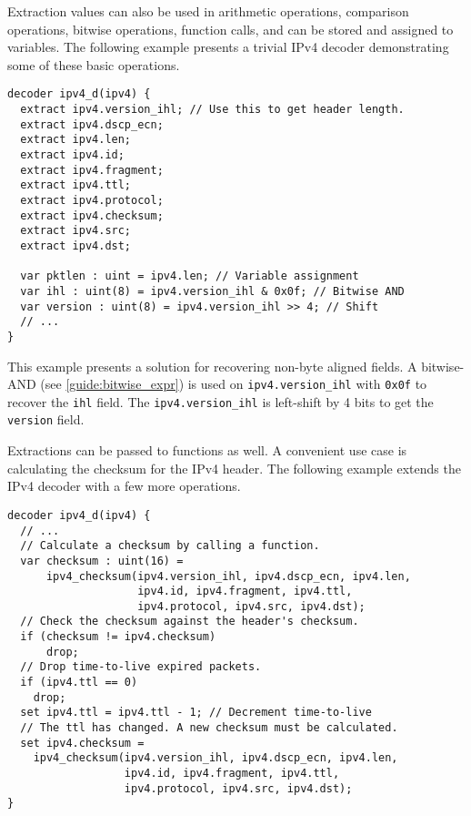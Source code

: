 Extraction values can also be used in arithmetic operations, comparison 
operations, bitwise operations, function calls,
and can be stored and assigned to variables. The following example presents
a trivial IPv4 decoder demonstrating some of these basic operations.

\begin{codepage}
\begin{lstlisting}
decoder ipv4_d(ipv4) {
  extract ipv4.version_ihl; // Use this to get header length.
  extract ipv4.dscp_ecn;
  extract ipv4.len;
  extract ipv4.id;
  extract ipv4.fragment;
  extract ipv4.ttl;
  extract ipv4.protocol;
  extract ipv4.checksum;
  extract ipv4.src;
  extract ipv4.dst;
  
  var pktlen : uint = ipv4.len; // Variable assignment
  var ihl : uint(8) = ipv4.version_ihl & 0x0f; // Bitwise AND
  var version : uint(8) = ipv4.version_ihl >> 4; // Shift
  // ...
}
\end{lstlisting}
\end{codepage}

This example presents a solution for recovering non-byte aligned
fields. A bitwise-AND (see \ref{guide:bitwise_expr}) is used on \texttt{ipv4.version\_ihl}
with \texttt{0x0f} to recover the \texttt{ihl} field. The 
\texttt{ipv4.version\_ihl} is left-shift by 4 bits to get the \texttt{version} field.

Extractions can be passed to functions as well. A convenient use case is 
calculating the checksum for the IPv4 header. 
The following example extends the IPv4 decoder with a few more operations.

\begin{codepage}
\begin{lstlisting}
decoder ipv4_d(ipv4) {
  // ...
  // Calculate a checksum by calling a function.
  var checksum : uint(16) =
      ipv4_checksum(ipv4.version_ihl, ipv4.dscp_ecn, ipv4.len, 
                    ipv4.id, ipv4.fragment, ipv4.ttl, 
                    ipv4.protocol, ipv4.src, ipv4.dst);
  // Check the checksum against the header's checksum.
  if (checksum != ipv4.checksum)
	  drop;
  // Drop time-to-live expired packets.
  if (ipv4.ttl == 0)
    drop;
  set ipv4.ttl = ipv4.ttl - 1; // Decrement time-to-live
  // The ttl has changed. A new checksum must be calculated.
  set ipv4.checksum =
    ipv4_checksum(ipv4.version_ihl, ipv4.dscp_ecn, ipv4.len, 
                  ipv4.id, ipv4.fragment, ipv4.ttl, 
                  ipv4.protocol, ipv4.src, ipv4.dst);
}
\end{lstlisting}
\end{codepage}


